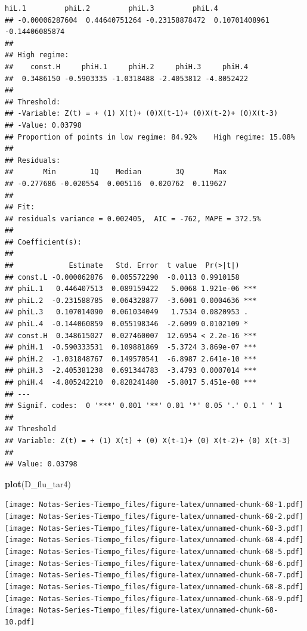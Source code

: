 \documentclass[
]{book}
\newenvironment{Shaded}{\begin{snugshade}}{\end{snugshade}}
\newcommand{\FunctionTok}[1]{\textcolor[rgb]{0.13,0.29,0.53}{\textbf{#1}}}
\newcommand{\NormalTok}[1]{#1}
\begin{document}
\begin{verbatim}
hiL.1         phiL.2         phiL.3         phiL.4 
## -0.00006287604  0.44640751264 -0.23158878472  0.10701408961 -0.14406085874 
## 
## High regime:
##    const.H     phiH.1     phiH.2     phiH.3     phiH.4 
##  0.3486150 -0.5903335 -1.0318488 -2.4053812 -4.8052422 
## 
## Threshold:
## -Variable: Z(t) = + (1) X(t)+ (0)X(t-1)+ (0)X(t-2)+ (0)X(t-3)
## -Value: 0.03798
## Proportion of points in low regime: 84.92%    High regime: 15.08% 
## 
## Residuals:
##       Min        1Q    Median        3Q       Max 
## -0.277686 -0.020554  0.005116  0.020762  0.119627 
## 
## Fit:
## residuals variance = 0.002405,  AIC = -762, MAPE = 372.5%
## 
## Coefficient(s):
## 
##             Estimate   Std. Error  t value  Pr(>|t|)    
## const.L -0.000062876  0.005572290  -0.0113 0.9910158    
## phiL.1   0.446407513  0.089159422   5.0068 1.921e-06 ***
## phiL.2  -0.231588785  0.064328877  -3.6001 0.0004636 ***
## phiL.3   0.107014090  0.061034049   1.7534 0.0820953 .  
## phiL.4  -0.144060859  0.055198346  -2.6099 0.0102109 *  
## const.H  0.348615027  0.027460007  12.6954 < 2.2e-16 ***
## phiH.1  -0.590333531  0.109881869  -5.3724 3.869e-07 ***
## phiH.2  -1.031848767  0.149570541  -6.8987 2.641e-10 ***
## phiH.3  -2.405381238  0.691344783  -3.4793 0.0007014 ***
## phiH.4  -4.805242210  0.828241480  -5.8017 5.451e-08 ***
## ---
## Signif. codes:  0 '***' 0.001 '**' 0.01 '*' 0.05 '.' 0.1 ' ' 1
## 
## Threshold
## Variable: Z(t) = + (1) X(t) + (0) X(t-1)+ (0) X(t-2)+ (0) X(t-3)
## 
## Value: 0.03798
\end{verbatim}

\begin{Shaded}
\begin{Highlighting}[]
\FunctionTok{plot}\NormalTok{(D\_flu\_tar4)}
\end{Highlighting}
\end{Shaded}

\texttt{[image: Notas-Series-Tiempo\_files/figure-latex/unnamed-chunk-68-1.pdf]} \texttt{[image: Notas-Series-Tiempo\_files/figure-latex/unnamed-chunk-68-2.pdf]} \texttt{[image: Notas-Series-Tiempo\_files/figure-latex/unnamed-chunk-68-3.pdf]} \texttt{[image: Notas-Series-Tiempo\_files/figure-latex/unnamed-chunk-68-4.pdf]} \texttt{[image: Notas-Series-Tiempo\_files/figure-latex/unnamed-chunk-68-5.pdf]} \texttt{[image: Notas-Series-Tiempo\_files/figure-latex/unnamed-chunk-68-6.pdf]} \texttt{[image: Notas-Series-Tiempo\_files/figure-latex/unnamed-chunk-68-7.pdf]} \texttt{[image: Notas-Series-Tiempo\_files/figure-latex/unnamed-chunk-68-8.pdf]} \texttt{[image: Notas-Series-Tiempo\_files/figure-latex/unnamed-chunk-68-9.pdf]} \texttt{[image: Notas-Series-Tiempo\_files/figure-latex/unnamed-chunk-68-10.pdf]}

  
\end{document}
